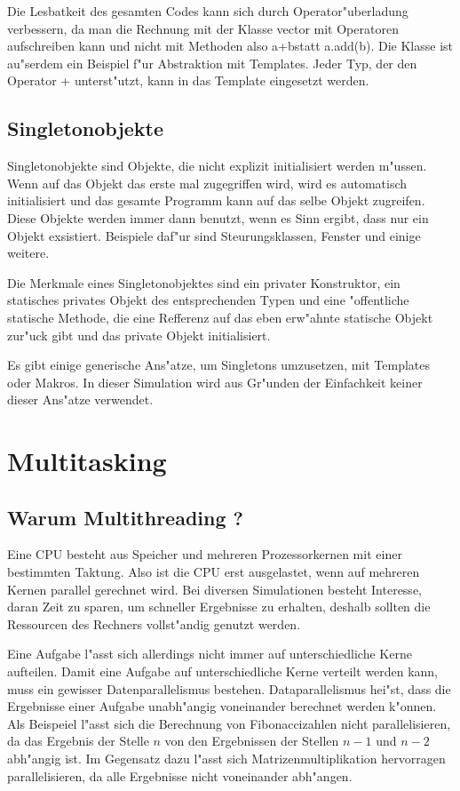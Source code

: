 \documentclass[14pt, a4paper]{report}
\begin{document}
Die Lesbatkeit des gesamten Codes kann sich durch Operator"uberladung verbessern, da man
die Rechnung mit der Klasse vector mit Operatoren aufschreiben kann und nicht mit 
Methoden also \glqq a+b\grqq statt \glqq a.add(b)\grqq. Die Klasse ist au"serdem ein Beispiel f"ur 
Abstraktion mit Templates. Jeder
Typ, der den Operator + unterst"utzt, kann in das Template eingesetzt werden.

\section{Singletonobjekte}
Singletonobjekte sind Objekte, die nicht explizit initialisiert werden m"ussen. Wenn auf
das Objekt das erste mal zugegriffen wird, wird es automatisch initialisiert und das
gesamte Programm kann auf das selbe Objekt zugreifen. Diese Objekte werden immer
dann benutzt, wenn es Sinn ergibt, dass nur ein Objekt exsistiert. Beispiele daf"ur
sind Steurungsklassen, Fenster und einige weitere.

Die Merkmale eines Singletonobjektes sind ein privater Konstruktor, ein statisches 
privates Objekt des entsprechenden Typen und eine "offentliche statische Methode, die 
eine Refferenz auf das eben erw"ahnte statische Objekt zur"uck gibt und das private
Objekt initialisiert.

Es gibt einige generische Ans"atze, um Singletons umzusetzen, mit Templates oder Makros.
In dieser Simulation wird aus Gr"unden der Einfachkeit keiner dieser Ans"atze verwendet.

\chapter{Multitasking}
\section{Warum Multithreading ?}
Eine CPU besteht aus Speicher und mehreren Prozessorkernen mit einer bestimmten
Taktung. Also ist die CPU erst ausgelastet, wenn auf mehreren Kernen parallel
gerechnet wird. Bei diversen Simulationen besteht Interesse, daran Zeit zu sparen, um
schneller Ergebnisse zu erhalten, deshalb sollten die Ressourcen des Rechners 
vollst"andig genutzt werden.

Eine Aufgabe l"asst sich allerdings nicht immer auf unterschiedliche Kerne aufteilen.
Damit eine Aufgabe auf unterschiedliche Kerne verteilt werden kann, muss ein gewisser
Datenparallelismus bestehen. Dataparallelismus hei"st, dass die Ergebnisse einer Aufgabe
unabh"angig voneinander berechnet werden k"onnen. Als Beispeiel l"asst sich die
Berechnung von Fibonaccizahlen nicht parallelisieren, da das Ergebnis der Stelle $n$ von
den Ergebnissen der Stellen $n-1$ und $n-2$ abh"angig ist. Im Gegensatz dazu l"asst sich
Matrizenmultiplikation hervorragen parallelisieren, da alle Ergebnisse nicht voneinander
abh"angen.
\end{document}
